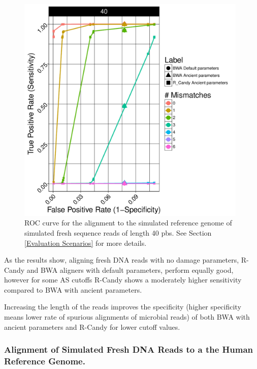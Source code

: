 \documentclass[11pt,a4paper]{report}
\begin{document}
\begin{figure}[H]
\centering
\includegraphics[width=11cm]{pictures/DS3_40_19_emp.pdf}

\caption{
ROC curve for the alignment to the simulated reference genome of simulated 
fresh sequence reads of length 40 pbs. See Section \ref{Evaluation Scenarios}
for more details.}

\label{DS3_40}
\end{figure}

As the results show, aligning fresh DNA reads with no damage parameters, 
R-Candy and BWA aligners with default parameters, perform equally good, 
however for some AS cutoffs R-Candy shows a moderately higher sensitivity 
compared to BWA with ancient parameters.

Increasing the length of the reads improves the specificity (higher
specificity means lower rate of spurious alignments of microbial reads)
of both BWA with ancient parameters and R-Candy for lower cutoff values.



\subsubsection{ Alignment of Simulated Fresh DNA Reads to a the Human Reference Genome.}
\label{ Alignment of Simulated Fresh DNA Reads to a the Human Reference Genome.}
\end{document}
